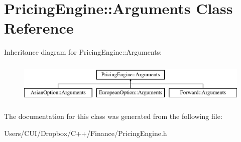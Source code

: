 \hypertarget{class_pricing_engine_1_1_arguments}{}\section{Pricing\+Engine\+:\+:Arguments Class Reference}
\label{class_pricing_engine_1_1_arguments}
Inheritance diagram for Pricing\+Engine\+:\+:Arguments\+:\begin{figure}[H]
\begin{center}
\leavevmode
\includegraphics[height=2.000000cm]{class_pricing_engine_1_1_arguments}
\end{center}
\end{figure}


The documentation for this class was generated from the following file\+:\begin{DoxyCompactItemize}
\item 
Users/\+C\+U\+I/\+Dropbox/\+C++/\+Finance/Pricing\+Engine.\+h\end{DoxyCompactItemize}
